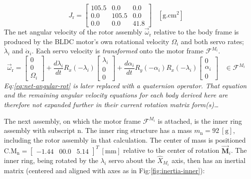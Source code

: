 \begin{equation}\label{eq:prop-inertia}
J_\text{r}=\begin{bmatrix}
105.5 & 0.0 & 0.0\\
0.0 & 105.5 & 0.0\\
0.0 & 0.0 & 41.8
\end{bmatrix}~~~~[\text{g.cm}^2]
\end{equation}
The net angular velocity of the rotor assembly $\vec{\omega}_\text{r}$ relative to the body frame is produced by the BLDC motor's own rotational velocity $\Omega_i$ and both servo rates; $\dot{\lambda}_i$ and $\dot{\alpha}_i$. Each servo velocity is \emph{transformed} onto the motor frame $\mathcal{F}^{M_i}$.
\newpage
\begin{equation}\label{eq:net-angular-rot}
\vec{\omega}_\text{r}=\begin{bmatrix}
0\\
0\\
\Omega_i
\end{bmatrix}
+\frac{d\lambda_i}{dt}R_x(-\lambda_i)\begin{bmatrix}
\lambda_i\\
0\\
0
\end{bmatrix}+\frac{d\alpha_i}{dt}R_y(-\alpha_i)R_x(-\lambda_i)\begin{bmatrix}
0\\
\alpha_i\\
0
\end{bmatrix}~~~~\in\mathcal{F}^{M_i}
\end{equation}
\emph{\color{gray} Eq:\ref{eq:net-angular-rot} is later replaced with a quaternion operator. That equation and the remaining angular velocity equations for each body derived here are therefore not expanded further in their current rotation matrix form(s)\ldots}
\par
The next assembly, on which the motor frame $\mathcal{F}^{M_i}$ is attached, is the inner ring assembly with subscript n. The inner ring structure has a mass $m_\text{n}=92~[\text{g}]$, including the rotor assembly in that calculation. The center of mass is positioned $\text{C.M}_{\text{n}}=\begin{bmatrix}-1.44&00.0&5.14\end{bmatrix}^T~[\text{mm}]$ relative to the center of rotation $\vec{\mathbf{M}}_i$. The inner ring, being rotated by the $\lambda_i$ servo about the $\hat{X}_{M_i}$ axis, then has an inertial matrix (centered and aligned with axes as in Fig:\ref{fig:inertia-inner}):
